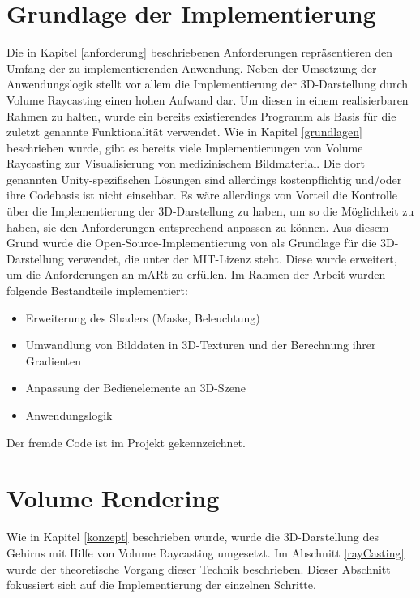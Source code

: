 
\section{Grundlage der Implementierung}

Die in Kapitel \ref{anforderung} beschriebenen Anforderungen repräsentieren den Umfang der zu implementierenden Anwendung. 
Neben der Umsetzung der Anwendungslogik stellt vor allem die Implementierung der 3D-Darstellung durch Volume Raycasting einen hohen Aufwand dar. Um diesen in einem realisierbaren Rahmen zu halten, wurde ein bereits existierendes Programm als Basis für die zuletzt genannte Funktionalität verwendet.
Wie in Kapitel \ref{grundlagen} beschrieben wurde, gibt es bereits viele Implementierungen von Volume Raycasting zur Visualisierung von medizinischem Bildmaterial. 
Die dort genannten Unity-spezifischen Lösungen sind allerdings kostenpflichtig und/oder ihre Codebasis ist nicht einsehbar. Es wäre allerdings von Vorteil die Kontrolle über die Implementierung der 3D-Darstellung zu haben, um so die Möglichkeit zu haben, sie den Anforderungen entsprechend anpassen zu können.
Aus diesem Grund wurde die Open-Source-Implementierung von \cite{volumeRenderingGit} als Grundlage für die 3D-Darstellung verwendet, die unter der MIT-Lizenz steht.
Diese wurde erweitert, um die Anforderungen an mARt zu erfüllen. 
Im Rahmen der Arbeit wurden folgende Bestandteile implementiert:

\begin{itemize}
\item Erweiterung des Shaders (Maske, Beleuchtung)
\item Umwandlung von Bilddaten in 3D-Texturen und der Berechnung ihrer Gradienten
\item Anpassung der Bedienelemente an 3D-Szene
\item Anwendungslogik
\end{itemize}
Der fremde Code ist im Projekt gekennzeichnet.

\section{Volume Rendering}

Wie in Kapitel \ref{konzept} beschrieben wurde, wurde die 3D-Darstellung des Gehirns mit Hilfe von Volume Raycasting umgesetzt. 
Im Abschnitt \ref{rayCasting} wurde der theoretische Vorgang dieser Technik beschrieben. Dieser Abschnitt fokussiert sich auf die Implementierung der einzelnen Schritte.

